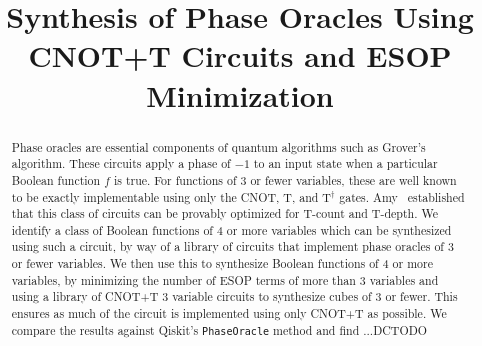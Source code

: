 \documentclass[conference]{IEEEtran}
\begin{document}
\title{Synthesis of Phase Oracles Using CNOT+T Circuits and ESOP Minimization}
\author{
    \IEEEauthorblockN{\phantom{David Clarino}}
    \IEEEauthorblockA{\phantom{Ritsumeikan University} \\
      \phantom{dclarino@fc.ritsumei.ac.jp}}
    \and 
    \IEEEauthorblockN{\phantom{Chitranshu Arya}}
    \IEEEauthorblockA{\phantom{Netaji Subhas} \\
      \phantom{University of Technology} \\
      \phantom{chitranshu.arya.ug22@nsut.ac.in}}
    \and
    \IEEEauthorblockN{\phantom{Shigeru Yamashita}}
    \IEEEauthorblockA{\phantom{Ritsumeikan University} \\
      \phantom{ger@cs.ritsumei.ac.jp}}
    \and
    \IEEEauthorblockN{\phantom{Zanhe Qi}}
    \IEEEauthorblockA{\phantom{Ritsumeikan University} \\ \phantom{goose@ngc.is.ritsumei.ac.jp}}
}

\maketitle

\begin{abstract}
Phase oracles are essential components of quantum algorithms such as Grover's algorithm. These circuits apply a phase of $-1$ to an input state when a particular Boolean function $f$ is true. For functions of 3 or fewer variables, these are well known to be exactly implementable using only the CNOT, T, and T$^\dagger$ gates. Amy~\cite{bib-amy-matroid} established that this class of circuits can be provably optimized for T-count and T-depth. We identify a class of Boolean functions of 4 or more variables which can be synthesized using such a circuit, by way of a library of circuits that implement phase oracles of 3 or fewer variables. We then use this to synthesize Boolean functions of 4 or more variables, by minimizing the number of ESOP terms of more than 3 variables and using a library of CNOT+T 3 variable circuits to synthesize cubes of 3 or fewer. This ensures as much of the circuit is implemented using only CNOT+T as possible. We compare the results against Qiskit's \texttt{PhaseOracle} method and find ...DCTODO
\end{abstract}
















\end{document}
